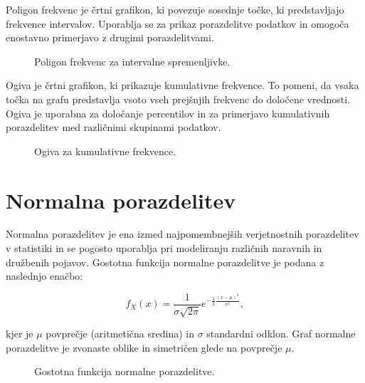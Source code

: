 Poligon frekvenc je črtni grafikon, ki povezuje sosednje točke, ki predstavljajo frekvence intervalov. Uporablja se za prikaz porazdelitve podatkov in omogoča enostavno primerjavo z drugimi porazdelitvami.

\begin{figure}
    \centering
    \caption{Poligon frekvenc za intervalne spremenljivke.}
\end{figure}

Ogiva je črtni grafikon, ki prikazuje kumulativne frekvence. To pomeni, da vsaka točka na grafu predstavlja vsoto vseh prejšnjih frekvenc do določene vrednosti. Ogiva je uporabna za določanje percentilov in za primerjavo kumulativnih porazdelitev med različnimi skupinami podatkov.

\begin{figure}
    \centering
    \caption{Ogiva za kumulativne frekvence.}
\end{figure}

\section{Normalna porazdelitev}

Normalna porazdelitev je ena izmed najpomembnejših verjetnostnih porazdelitev v statistiki in se pogosto uporablja pri modeliranju različnih naravnih in družbenih pojavov. Gostotna funkcija normalne porazdelitve je podana z naslednjo enačbo:

\[f_X(x) = \frac{1}{\sigma\sqrt{2\pi}} e^{-\frac{1}{2} \frac{(x-\mu)^2}{\sigma^2}},\]

kjer je $\mu$ povprečje (aritmetična sredina) in $\sigma$ standardni odklon. Graf normalne porazdelitve je zvonaste oblike in simetričen glede na povprečje $\mu$.

\begin{figure}
\centering
{}
\caption{Gostotna funkcija normalne porazdelitve.}
\end{figure}

